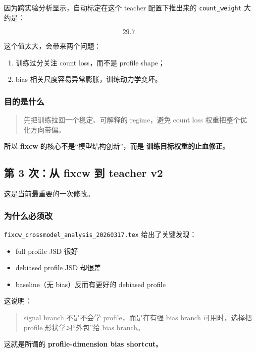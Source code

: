 \documentclass[11pt,a4paper]{ctexart}
\begin{document}
因为跨实验分析显示，自动标定在这个 teacher 配置下推出来的
\texttt{count\_weight} 大约是：

\[
29.7
\]

这个值太大，会带来两个问题：

\begin{enumerate}[leftmargin=2em]
\item 训练过分关注 count loss，而不是 profile shape；
\item bias 相关尺度容易异常膨胀，训练动力学变坏。
\end{enumerate}

\subsubsection*{目的是什么}

\begin{quote}
先把训练拉回一个稳定、可解释的 regime，避免 count loss 权重把整个优化方向带偏。
\end{quote}

所以 \textbf{fixcw} 的核心不是“模型结构创新”，而是
\textbf{训练目标权重的止血修正}。

\subsection{第 3 次：从 fixcw 到 teacher v2}

这是当前最重要的一次修改。

\subsubsection*{为什么必须改}

\texttt{fixcw\_crossmodel\_analysis\_20260317.tex} 给出了关键发现：

\begin{itemize}[leftmargin=2em]
\item full profile JSD 很好
\item debiased profile JSD 却很差
\item baseline（无 bias）反而有更好的 debiased profile
\end{itemize}

这说明：

\begin{quote}
signal branch 不是不会学 profile，而是在有强 bias branch 可用时，选择把 profile 形状学习“外包”给 bias branch。
\end{quote}

这就是所谓的 \textbf{profile-dimension bias shortcut}。
\end{document}
